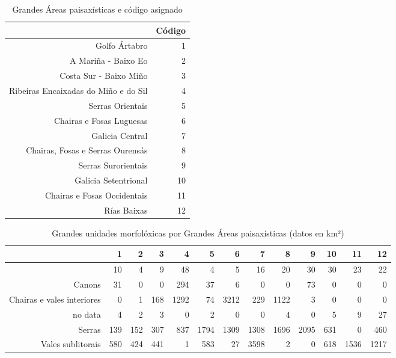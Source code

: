 \begin{table}[p]
\centering
\caption{Grandes Áreas paisaxísticas e código asignado} 
\label{xtaboa0}
\begin{tabular}{rr}
  \hline
 & Código \\ 
  \hline
Golfo Ártabro &   1 \\ 
  A Mariña - Baixo Eo &   2 \\ 
  Costa Sur - Baixo Miño &   3 \\ 
  Ribeiras Encaixadas do Miño e do Sil &   4 \\ 
  Serras Orientais &   5 \\ 
  Chairas e Fosas Luguesas &   6 \\ 
  Galicia Central &   7 \\ 
  Chairas, Fosas e Serras Ourensás &   8 \\ 
  Serras Surorientais &   9 \\ 
  Galicia Setentrional &  10 \\ 
  Chairas e Fosas Occidentais &  11 \\ 
  Rías Baixas &  12 \\ 
   \hline
\end{tabular}
\end{table}
\begin{table}[p]
\centering
\caption{Grandes unidades morfolóxicas por Grandes Áreas paisaxísticas (datos en km²)} 
\label{xtaboa1}
\begin{tabular}{rrrrrrrrrrrrr}
  \hline
 & 1 & 2 & 3 & 4 & 5 & 6 & 7 & 8 & 9 & 10 & 11 & 12 \\ 
  \hline
 & 10 & 4 & 9 & 48 & 4 & 5 & 16 & 20 & 30 & 30 & 23 & 22 \\ 
  Canons & 31 & 0 & 0 & 294 & 37 & 6 & 0 & 0 & 73 & 0 & 0 & 0 \\ 
  Chairas e vales interiores & 0 & 1 & 168 & 1292 & 74 & 3212 & 229 & 1122 & 3 & 0 & 0 & 0 \\ 
  no data & 4 & 2 & 3 & 0 & 2 & 0 & 0 & 4 & 0 & 5 & 9 & 27 \\ 
  Serras & 139 & 152 & 307 & 837 & 1794 & 1309 & 1308 & 1696 & 2095 & 631 & 0 & 460 \\ 
  Vales sublitorais & 580 & 424 & 441 & 1 & 583 & 27 & 3598 & 2 & 0 & 618 & 1536 & 1217 \\ 
   \hline
\end{tabular}
\end{table}
